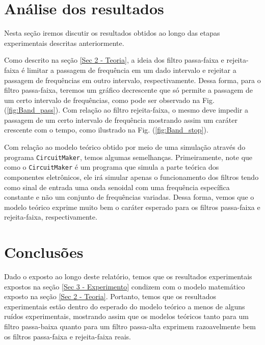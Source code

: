 \documentclass[letterpaper, 12pt]{article}
\begin{document}
\section{Análise dos resultados}\label{Sec 4 - Resultados}
Nesta seção iremos discutir os resultados obtidos ao longo das etapas experimentais descritas anteriormente.

Como descrito na seção \ref{Sec 2 - Teoria}, a ideia dos filtro passa-faixa e rejeita-faixa é limitar a passagem de frequência em um dado intervalo e rejeitar a passagem de frequências em outro intervalo, respectivamente. Dessa forma, para o filtro passa-faixa, teremos um gráfico decrescente que só permite a passagem de um certo intervalo de frequências, como pode ser observado na Fig. (\ref{fig:Band_pass}). Com relação ao filtro rejeita-faixa, o mesmo deve impedir a passagem de um certo intervalo de frequência mostrando assim um caráter crescente com o tempo, como ilustrado na Fig. (\ref{fig:Band_stop}). 


Com relação ao modelo teórico obtido por meio de uma simulação através do programa \texttt{CircuitMaker}, temos algumas semelhanças. Primeiramente, note que como o \texttt{CircuitMaker} é um programa que simula a parte teórica dos componentes eletrônicos, ele irá simular apenas o funcionamento dos filtros tendo como sinal de entrada uma onda senoidal com uma frequência específica constante e não um conjunto de frequências variadas. Dessa forma, vemos que o modelo teórico exprime muito bem o caráter esperado para os filtros passa-faixa e rejeita-faixa, respectivamente.



\section{Conclusões}\label{Sec 5 - Conclusão}
Dado o exposto ao longo deste relatório, temos que os resultados experimentais expostos na seção \ref{Sec 3 - Experimento} condizem com o modelo matemático exposto na seção \ref{Sec 2 - Teoria}. Portanto, temos que os resultados experimentais estão dentro do esperado do modelo teórico a menos de alguns ruídos experimentais, mostrando assim que os modelos teóricos tanto para um filtro passa-baixa quanto para um filtro passa-alta exprimem razoavelmente bem os filtros passa-faixa e rejeita-faixa reais.
\end{document}

